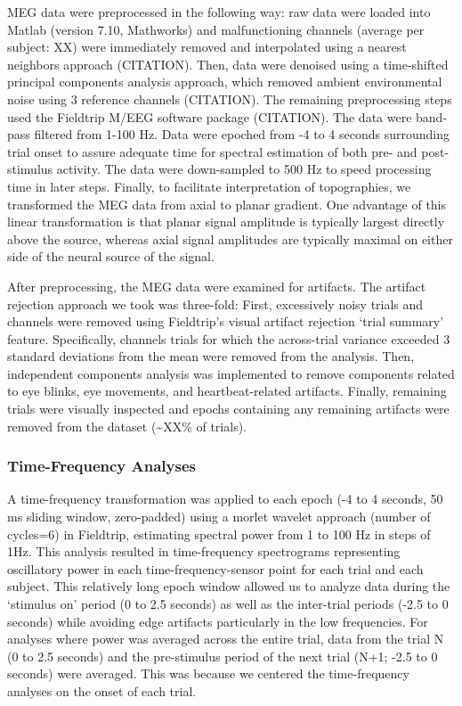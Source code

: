 MEG data were preprocessed in the following way: raw data were loaded
into Matlab (version 7.10, Mathworks) and malfunctioning channels
(average per subject: XX) were immediately removed and interpolated
using a nearest neighbors approach (CITATION). Then, data were denoised
using a time-shifted principal components analysis approach, which
removed ambient environmental noise using 3 reference channels
(CITATION). The remaining preprocessing steps used the Fieldtrip M/EEG
software package (CITATION). The data were band-pass filtered from 1-100
Hz. Data were epoched from -4 to 4 seconds surrounding trial onset to
assure adequate time for spectral estimation of both pre- and
post-stimulus activity. The data were down-sampled to 500 Hz to speed
processing time in later steps. Finally, to facilitate interpretation of
topographies, we transformed the MEG data from axial to planar gradient.
One advantage of this linear transformation is that planar signal
amplitude is typically largest directly above the source, whereas axial
signal amplitudes are typically maximal on either side of the neural
source of the signal.

After preprocessing, the MEG data were examined for artifacts. The
artifact rejection approach we took was three-fold: First, excessively
noisy trials and channels were removed using Fieldtrip's visual artifact
rejection `trial summary' feature. Specifically, channels trials for
which the across-trial variance exceeded 3 standard deviations from the
mean were removed from the analysis. Then, independent components
analysis was implemented to remove components related to eye blinks, eye
movements, and heartbeat-related artifacts. Finally, remaining trials
were visually inspected and epochs containing any remaining artifacts
were removed from the dataset (\textasciitilde{}XX\% of trials).

\subsubsection{Time-Frequency Analyses}\label{time-frequency-analyses}

A time-frequency transformation was applied to each epoch (-4 to 4
seconds, 50 ms sliding window, zero-padded) using a morlet wavelet
approach (number of cycles=6) in Fieldtrip, estimating spectral power
from 1 to 100 Hz in steps of 1Hz. This analysis resulted in
time-frequency spectrograms representing oscillatory power in each
time-frequency-sensor point for each trial and each subject. This
relatively long epoch window allowed us to analyze data during the
`stimulus on' period (0 to 2.5 seconds) as well as the inter-trial
periods (-2.5 to 0 seconds) while avoiding edge artifacts particularly
in the low frequencies. For analyses where power was averaged across the
entire trial, data from the trial N (0 to 2.5 seconds) and the
pre-stimulus period of the next trial (N+1; -2.5 to 0 seconds) were
averaged. This was because we centered the time-frequency analyses on
the onset of each trial.


